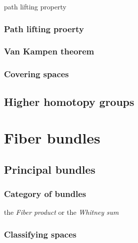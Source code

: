 \documentclass{../../large}
\begin{document}
\begin{prb}
path lifting property
\end{prb}
\section{Path lifting proerty}

\section{Van Kampen theorem}

\section{Covering spaces}


\chapter{Higher homotopy groups}
\chapter{}







\part{Fiber bundles}
\chapter{Principal bundles}

\section{Category of bundles}
\begin{prb}
\end{prb}

\begin{prb}
the \emph{Fiber product} or the \emph{Whitney sum}
\end{prb}



\section{Classifying spaces}
\end{document}
